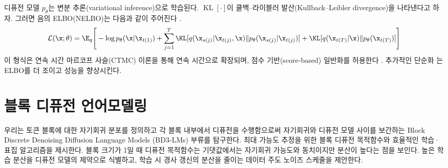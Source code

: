 \documentclass{article} %
\def\algofull{Block Discrete Denoising Diffusion Language Models}
\def\algos{BD3-LMs}
\begin{document}
디퓨전 모델 $p_\theta$는 변분 추론(variational inference)으로 학습된다. $\operatorname{KL}[\cdot]$이 쿨백–라이블러 발산(Kullback–Leibler divergence)을 나타낸다고 하자. 그러면 음의 ELBO(NELBO)는 다음과 같이 주어진다 \citep{sohl2015deep}.
{\footnotesize
\begin{align}\label{eqn:elbo}
    \mathcal{L}(\x; \theta) = \E_q\Bigg[- \log p_\theta(
    \x | \x_{t(1)}) + \sum_{j=1}^T \KL[q(\x_{s(j)} | \x_{t(j)}, \x) \| p_\theta(\x_{s(j)} | \x_{t(j)})]
    + \KL[q(\x_{t(T)} | \x) \| p_\theta(\x_{t(T)})] \Bigg]
\end{align}
}
이 형식은 연속 시간 마르코프 사슬(CTMC) 이론을 통해 연속 시간으로 확장되며, 점수 기반(score-based) 일반화를 허용한다 \citep{song2019generative, lou2024discrete, sun2022score}. 추가적인 단순화 \citep{sahoo2024simple, shi2024simplified, ou2025your}는 ELBO를 더 조이고 성능을 향상시킨다.

\section{블록 디퓨전 언어모델링}
우리는 토큰 블록에 대한 자기회귀 분포를 정의하고 각 블록 내부에서 디퓨전을 수행함으로써 자기회귀와 디퓨전 모델 사이를 보간하는 \algofull{} (\algos{}) 부류를 탐구한다. 최대 가능도 추정을 위한 블록 디퓨전 목적함수와 효율적인 학습·표집 알고리즘을 제시한다. 블록 크기가 1일 때 디퓨전 목적함수는 기댓값에서는 자기회귀 가능도와 동치이지만 분산이 높다는 점을 보인다. 높은 학습 분산을 디퓨전 모델의 제약으로 식별하고, 학습 시 경사 갱신의 분산을 줄이는 데이터 주도 노이즈 스케줄을 제안한다.

\end{document}
